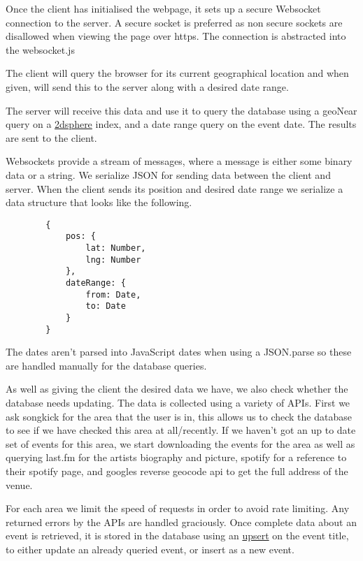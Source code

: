 \documentclass[10pt]{article}
\begin{document}
        Once the client has initialised the webpage, it sets up a secure Websocket connection to the server. A secure socket is preferred as non secure sockets are disallowed when viewing the page over https. The connection is abstracted into the websocket.js

        The client will query the browser for its current geographical location and when given, will send this to the server along with a desired date range. 

        The server will receive this data and use it to query the database using a geoNear query on a \href{https://docs.mongodb.com/manual/core/2dsphere/}{2dsphere} index, and a date range query on the event date. The results are sent to the client.

        Websockets provide a stream of messages, where a message is either some binary data or a string. We serialize JSON for sending data between the client and server. When the client sends its position and desired date range we serialize a data structure that looks like the following.

        \begin{verbatim}
        {
            pos: {
                lat: Number,
                lng: Number
            },
            dateRange: {
                from: Date,
                to: Date
            }
        }
        \end{verbatim}

        The dates aren't parsed into JavaScript dates when using a JSON.parse so these are handled manually for the database queries.

        As well as giving the client the desired data we have, we also check whether the database needs updating. The data is collected using a variety of APIs. First we ask songkick for the area that the user is in, this allows us to check the database to see if we have checked this area at all/recently. If we haven't got an up to date set of events for this area, we start downloading the events for the area as well as querying last.fm for the artists biography and picture, spotify for a reference to their spotify page, and googles reverse geocode api to get the full address of the venue.

        For each area we limit the speed of requests in order to avoid rate limiting. Any returned errors by the APIs are handled graciously. Once complete data about an event is retrieved, it is stored in the database using an \href{https://docs.mongodb.com/manual/reference/method/db.collection.update/#upsert-option}{upsert} on the event title, to either update an already queried event, or insert as a new event.
\end{document}
